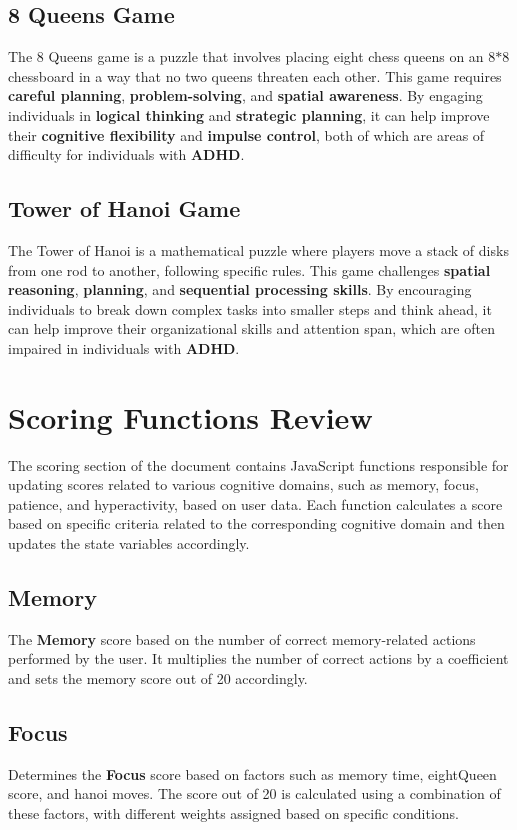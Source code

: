 \documentclass{article}
\begin{document}
\subsection{8 Queens Game}
The 8 Queens game is a puzzle that involves placing eight chess queens on an 8$*$8 chessboard in a way that no two queens threaten each other. 
This game requires \textbf{careful planning}, \textbf{problem-solving}, and \textbf{spatial awareness}. 
By engaging individuals in \textbf{logical thinking} and \textbf{strategic planning}, it can help improve their \textbf{cognitive flexibility} and \textbf{impulse control}, both of which are areas of difficulty for individuals with \textbf{ADHD}.

\subsection{Tower of Hanoi Game}
The Tower of Hanoi is a mathematical puzzle where players move a stack of disks from one rod to another, following specific rules. 
This game challenges \textbf{spatial reasoning}, \textbf{planning}, and \textbf{sequential processing skills}. 
By encouraging individuals to break down complex tasks into smaller steps and think ahead, it can help improve their organizational skills and attention span, which are often impaired in individuals with \textbf{ADHD}.

\section{Scoring Functions Review}
The scoring section of the document contains JavaScript functions responsible for updating scores related to various cognitive domains, such as memory, focus, patience, and hyperactivity, based on user data. Each function calculates a score based on specific criteria related to the corresponding cognitive domain and then updates the state variables accordingly.

\subsection{Memory}
The \textbf{Memory} score based on the number of correct memory-related actions performed by the user. It multiplies the number of correct actions by a coefficient and sets the memory score out of 20 accordingly.

\subsection{Focus}
Determines the \textbf{Focus} score based on factors such as memory time, eightQueen score, and hanoi moves. The score out of 20 is calculated using a combination of these factors, with different weights assigned based on specific conditions.
\end{document}
